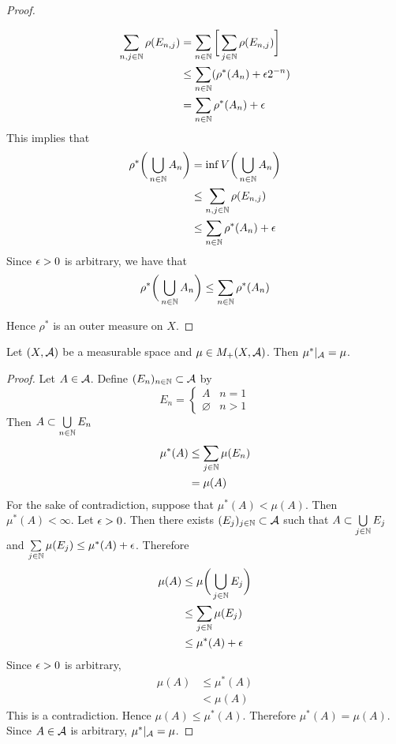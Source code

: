 \documentclass{book}
\begin{document}
\begin{proof}
\begin{enumerate}
			\begin{align*}
				\sum\limits_{n,j \in \mathbb{N}} \rho(E_{n,j}) 
				& = \sum\limits_{n \in \mathbb{N}} \bigg[ \sum\limits_{j \in \mathbb{N}} \rho(E_{n,j})  \bigg] \\
				& \leq \sum\limits_{n \in \mathbb{N}} (\rho^*(A_n) + \epsilon 2^{-n}) \\
				& = \sum\limits_{n \in \mathbb{N}} \rho^*(A_n) + \epsilon
			\end{align*}
			This implies that 
			\begin{align*}
				\rho^* \bigg( \bigcup\limits_{n \in \mathbb{N}} A_n \bigg) 
				& = \inf V \bigg( \bigcup\limits_{n \in \mathbb{N}} A_n \bigg) \\
				& \leq \sum\limits_{n,j \in \mathbb{N}} \rho(E_{n,j})  \\
				& \leq \sum\limits_{n \in \mathbb{N}} \rho^*(A_n) + \epsilon
			\end{align*}
			Since $\epsilon >0$ is arbitrary, we have that
			$$\rho^* \bigg( \bigcup\limits_{n \in \mathbb{N}} A_n \bigg) \leq \sum\limits_{n \in \mathbb{N}} \rho^*(A_n)$$
		\end{enumerate}
		Hence $\rho^*$ is an outer measure on $X$.
	\end{proof}
	
	\begin{ex}  
		Let $(X, \mathcal{A})$ be a measurable space and $\mu \in M_+(X, \mathcal{A})$. Then $\mu^*|_{\mathcal{A}} = \mu$.
	\end{ex}
	
	\begin{proof}
		Let $A \in \mathcal{A}$. Define $(E_n)_{n \in \mathbb{N}} \subset \mathcal{A}$ by 
		\[
		E_n = 
		\begin{cases}
			A & n = 1 \\
			\varnothing & n > 1
		\end{cases}  
		\]
		Then $A \subset \bigcup\limits_{n \in \mathbb{N}} E_n$
		\begin{align*}
			\mu^*(A)
			& \leq \sum\limits_{j \in \mathbb{N}} \mu(E_n) \\
			& = \mu(A) 
		\end{align*}
		For the sake of contradiction, suppose that $\mu^*(A) < \mu(A)$. Then $\mu^*(A) < \infty$. Let $\epsilon > 0$. Then there exists $(E_j)_{j \in \mathbb{N}} \subset \mathcal{A}$ such that $A \subset \bigcup\limits_{j \in \mathbb{N}} E_j$ and $\sum\limits_{j \in \mathbb{N}} \mu(E_j) \leq \mu^*(A) + \epsilon$. Therefore
		\begin{align*}
			\mu(A)
			& \leq \mu \bigg ( \bigcup\limits_{j \in \mathbb{N}} E_j \bigg) \\
			& \leq \sum\limits_{j \in \mathbb{N}} \mu(E_j) \\
			& \leq \mu^*(A) + \epsilon 
		\end{align*}
		Since $\epsilon >0$ is arbitrary,  
		\begin{align*}
			\mu(A) 
			& \leq \mu^*(A) \\
			& < \mu(A)
		\end{align*}
		This is a contradiction. Hence $\mu(A) \leq \mu^*(A)$. Therefore  $\mu^*(A) = \mu(A)$. Since $A \in \mathcal{A}$ is arbitrary, $\mu^*|_{\mathcal{A}} = \mu$.
	\end{proof}
	
\end{document}

